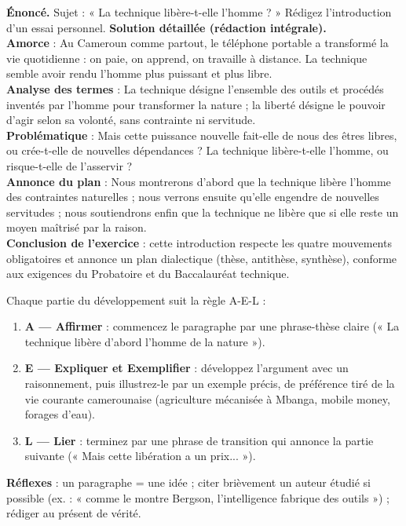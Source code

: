 \documentclass[11pt]{article}
\newcommand{\cle}[1]{{\popxbold\color{popdark}#1}}
\begin{document}
\begin{exoresolu}
\textbf{Énoncé.} Sujet : « La technique libère-t-elle l'homme ? » Rédigez l'introduction d'un essai personnel.
\tcblower
\textbf{Solution détaillée (rédaction intégrale).}\\
\textbf{Amorce} : Au Cameroun comme partout, le téléphone portable a transformé la vie quotidienne : on paie, on apprend, on travaille à distance. La technique semble avoir rendu l'homme plus puissant et plus libre.\\
\textbf{Analyse des termes} : La \cle{technique} désigne l'ensemble des outils et procédés inventés par l'homme pour transformer la nature ; la \cle{liberté} désigne le pouvoir d'agir selon sa volonté, sans contrainte ni servitude.\\
\textbf{Problématique} : Mais cette puissance nouvelle fait-elle de nous des êtres libres, ou crée-t-elle de nouvelles dépendances ? La technique libère-t-elle l'homme, ou risque-t-elle de l'asservir ?\\
\textbf{Annonce du plan} : Nous montrerons d'abord que la technique libère l'homme des contraintes naturelles ; nous verrons ensuite qu'elle engendre de nouvelles servitudes ; nous soutiendrons enfin que la technique ne libère que si elle reste un moyen maîtrisé par la raison.\\
\textbf{Conclusion de l'exercice} : cette introduction respecte les quatre mouvements obligatoires et annonce un plan dialectique (thèse, antithèse, synthèse), conforme aux exigences du Probatoire et du Baccalauréat technique.
\end{exoresolu}

\begin{methode}
Chaque partie du développement suit la règle A-E-L :
\begin{enumerate}
\item \textbf{A — Affirmer} : commencez le paragraphe par une phrase-thèse claire (« La technique libère d'abord l'homme de la nature »).
\item \textbf{E — Expliquer et Exemplifier} : développez l'argument avec un raisonnement, puis illustrez-le par un exemple précis, de préférence tiré de la vie courante camerounaise (agriculture mécanisée à Mbanga, mobile money, forages d'eau).
\item \textbf{L — Lier} : terminez par une phrase de transition qui annonce la partie suivante (« Mais cette libération a un prix... »).
\end{enumerate}
\textbf{Réflexes} : un paragraphe = une idée ; citer brièvement un auteur étudié si possible (ex. : « comme le montre Bergson, l'intelligence fabrique des outils ») ; rédiger au présent de vérité.
\end{methode}
\end{document}
